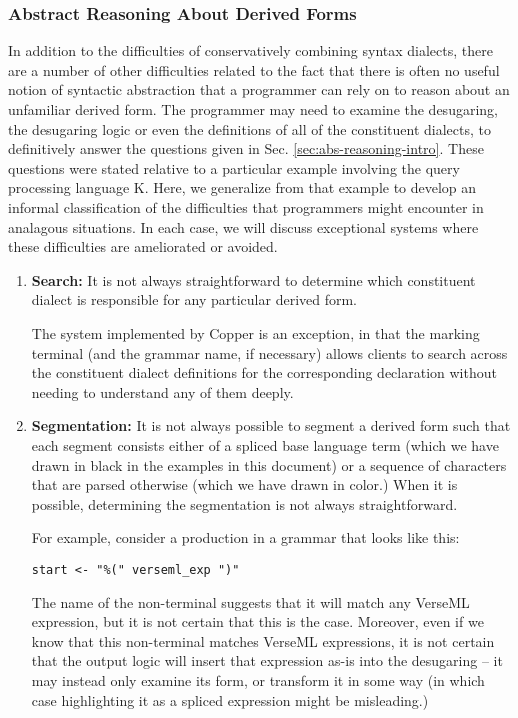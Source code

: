 {\subsubsection{Abstract Reasoning About Derived Forms}
In addition to the difficulties of conservatively combining syntax dialects, there are a  number of other difficulties related to the fact that there is often no useful notion of syntactic abstraction that a programmer can rely on to reason about an unfamiliar derived form. The programmer may need to examine the desugaring, the desugaring logic or even the definitions of all of the constituent dialects, to definitively answer the questions given in Sec. \ref{sec:abs-reasoning-intro}. These questions were stated relative to a particular example involving the query processing language K.  
Here, we generalize from that example to develop an informal classification of the difficulties that programmers might encounter in analagous situations. In each case, we will discuss exceptional systems where these difficulties are ameliorated or avoided.%

\begin{enumerate}
\item \textbf{Search:} It is not always straightforward to determine which constituent dialect is responsible for any particular derived form.

The system implemented by Copper \cite{conf/pldi/SchwerdfegerW09} is an exception, in that the marking terminal (and the grammar name, if necessary) allows clients to search across the constituent dialect definitions for the corresponding declaration without needing to understand any of them deeply.
\item \textbf{Segmentation:} It is not always possible to segment a derived form such that each segment consists either of a spliced base language term (which we have drawn in black in the examples in this document) or a sequence of characters that are parsed otherwise (which we have drawn in color.) When it is possible, determining the segmentation is not always straightforward.

For example, consider a production in a grammar that looks like this: 
\begin{lstlisting}[numbers=none]
start <- "%(" verseml_exp ")"
\end{lstlisting}

The name of the non-terminal  suggests that it will match any VerseML expression, but it is not certain that this is the case. Moreover, even if we know that this non-terminal matches VerseML expressions, it is not certain that the output logic will insert that expression as-is into the desugaring -- it may instead only examine its form, or transform it in some way (in which case highlighting it as a spliced expression might be misleading.)


\end{enumerate}}

